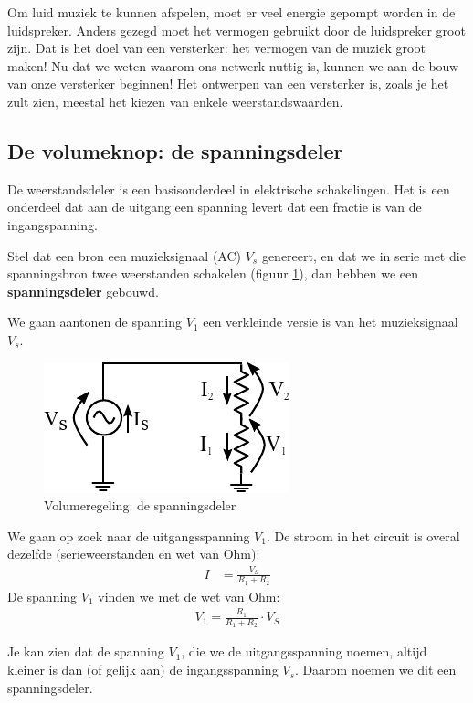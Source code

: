 \documentclass{article}
\begin{document}
			Om luid muziek te kunnen afspelen, moet er veel energie gepompt worden in de luidspreker. Anders gezegd moet het vermogen gebruikt door de luidspreker groot zijn. Dat is het  doel van een versterker: het vermogen van de muziek groot maken! Nu dat we weten waarom ons netwerk nuttig is, kunnen we aan de bouw van onze versterker beginnen! Het ontwerpen van een versterker is, zoals je het zult zien, meestal het kiezen van enkele weerstandswaarden.

		\subsection{De volumeknop: de spanningsdeler}

			De weerstandsdeler is een basisonderdeel in elektrische schakelingen. Het is een onderdeel dat aan de uitgang een spanning levert dat een fractie is van de ingangspanning.

			 Stel dat een bron een muzieksignaal (AC) $V_s$ genereert, en dat we in serie met die spanningsbron twee weerstanden schakelen (figuur \ref{fig:volume}), dan hebben we een  \textbf{spanningsdeler} gebouwd. 

			 We gaan aantonen de spanning $V_1$ een verkleinde versie is van het muzieksignaal $V_s$.

			\begin{figure}[htbp]
				\centering
				\includegraphics{weerstandsdeler}
				\caption{Volumeregeling: de spanningsdeler}
				\label{fig:volume}
			\end{figure}

			We gaan op zoek naar de uitgangsspanning $V_1$. De stroom in het circuit is overal dezelfde (serieweerstanden en wet van Ohm):
			\begin{align}
			    I &= \frac{V_S}{R_1 + R_2}
			\end{align}
			De spanning $V_1$ vinden we met de wet van Ohm:
			\begin{align}
			    V_1 = \frac{R_1}{R_1+R_2} \cdot V_S
			\end{align}

			Je kan zien dat de spanning $V_1$, die we de uitgangsspanning noemen, altijd kleiner is dan (of gelijk aan) de ingangsspanning $V_s$. Daarom noemen we dit een spanningsdeler.
\end{document}
